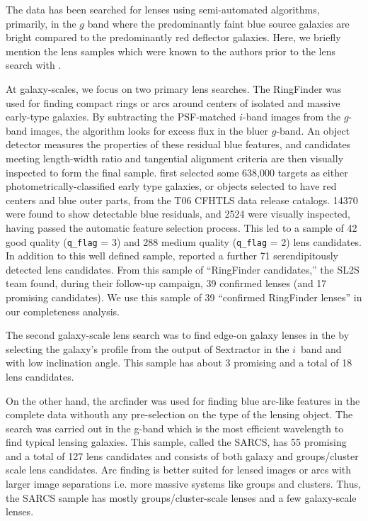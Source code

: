 \documentclass[useAMS,usenatbib,a4paper]{mn2e}
\begin{document}
The \cfhtls data has been searched for lenses using semi-automated algorithms,
primarily, in the $g$ band where the predominantly  faint blue  source
galaxies are bright compared to the predominantly red deflector galaxies.
Here, we briefly mention the lens samples which were known to the authors
prior to the lens search with \sw.

At galaxy-scales, we focus on two primary lens searches. The RingFinder
\citep{Gavazzi2014} was used for finding compact rings or arcs around centers
of isolated and massive early-type galaxies. By subtracting the PSF-matched
$i$-band images from the $g$-band images, the algorithm looks for excess flux
in the bluer $g$-band. An object detector measures the properties of these
residual blue features, and candidates meeting length-width ratio and
tangential alignment criteria are then visually inspected to form the final
sample. \citet{Gavazzi2014} first selected some 638,000 targets as either
photometrically-classified early type galaxies, or objects selected to have
red centers and blue outer parts, from the T06 CFHTLS data release catalogs. 
14370 were found to show detectable blue residuals, and 2524 were visually
inspected, having passed the automatic feature selection process. This led to
a sample of 42 good quality (\texttt{q\_flag} = 3) and 288 medium quality
(\texttt{q\_flag} = 2) lens candidates. In addition to this well defined
sample, \citet{Gavazzi2014} reported a further 71 serendipitously detected
lens candidates.  From this sample of ``RingFinder candidates,'' the SL2S team
found, during their follow-up campaign, 39 confirmed lenses (and 17 promising
candidates). We use this sample of 39 ``confirmed RingFinder lenses'' in our
completeness analysis.

The second galaxy-scale lens search was to find edge-on galaxy lenses in
the \cfhtls \citep{Sygnet2010} by selecting the galaxy's profile from the
output of {\sc Sextractor} in the $i$~band and with low inclination
angle. This sample has about 3 promising and a total of 18 lens
candidates.
 
On the other hand, the {\sc arcfinder} \citet{More2012} was used for
finding blue arc-like features in the complete \cfhtls data withouth any
pre-selection on the type of the lensing object. The search was carried
out in the g-band which is the most efficient wavelength to find typical
lensing galaxies. This sample, called the SARCS, has 55 promising and a
total of 127 lens candidates and consists of both galaxy and
groups/cluster scale lens candidates. Arc finding is better suited for
lensed images or arcs with larger image separations i.e. more massive
systems like groups and clusters. Thus, the SARCS sample has mostly
groups/cluster-scale lenses and a few galaxy-scale lenses.
\end{document}
